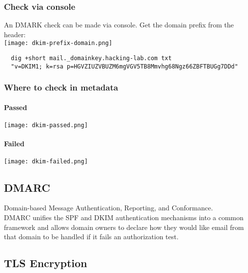 \subsubsection{Check via console}
An DMARK check can be made via console.
Get the domain prefix from the header:\\
\texttt{[image: dkim-prefix-domain.png]}

\begin{lstlisting}
  dig +short mail._domainkey.hacking-lab.com txt
  "v=DKIM1; k=rsa p=HGVZIUZVBUZM6mgVGV5TB8Mmvhg68Ngz66ZBFTBUGg7DDd"
\end{lstlisting}

\subsubsection{Where to check in metadata}
\paragraph{Passed}
\texttt{[image: dkim-passed.png]}

\paragraph{Failed}
\texttt{[image: dkim-failed.png]}

\subsection{DMARC}
Domain-based Message Authentication, Reporting, and Conformance.\\

DMARC unifies the SPF and DKIM authentication mechanisms into a common framework and allows domain owners to declare how they would like email from that domain to be handled if it fails an authorization test.

\subsection{TLS Encryption}